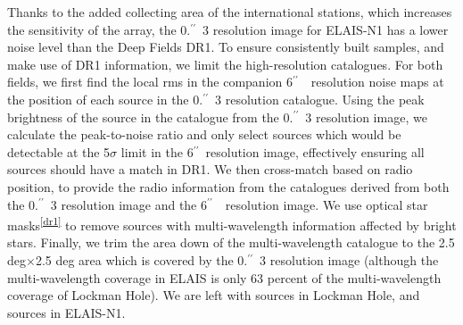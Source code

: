 \documentclass[usenatbib,fleqn,letters]{mnras}
\newcommand{\sarc}{$^{\prime\prime}\!\!$}
\begin{document}
Thanks to the added collecting area of the international stations, which increases the sensitivity of the array, the 0.\sarc\ 3 resolution image for ELAIS-N1 has a lower noise level than the Deep Fields DR1. To ensure consistently built samples, and make use of DR1 information, we limit the high-resolution catalogues. For both fields, 
we first find the local rms in the companion 6\sarc\ \ resolution noise maps at the position of each source in the 0.\sarc\ 3 resolution catalogue. Using the peak brightness of the source in the catalogue from the 0.\sarc\ 3 resolution image, we calculate the peak-to-noise ratio and only select sources which would be detectable at the 5$\sigma$ limit in the 6\sarc\ resolution image, effectively ensuring all sources should have a match in DR1. We then cross-match based on radio position, to provide the radio information from the catalogues derived from both the 0.\sarc\ 3 resolution image and the 6\sarc\ \ resolution image. We use optical star masks\textsuperscript{\ref{dr1}} to remove sources with multi-wavelength information affected by bright stars. Finally, we trim the area down of the multi-wavelength catalogue to the 2.5 deg$\times$2.5 deg area which is covered by the 0.\sarc\ 3 resolution image (although the multi-wavelength coverage in ELAIS is only 63 percent of the multi-wavelength coverage of Lockman Hole). We are left with sources in Lockman Hole, and sources in ELAIS-N1. %
\end{document}
